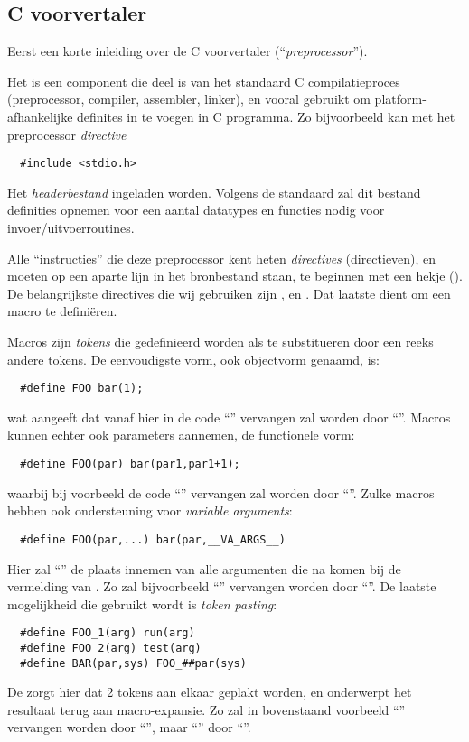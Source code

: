 \subsection{C voorvertaler} \label{sec:preproc}

Eerst een korte inleiding over de C voorvertaler (``{\em preprocessor}'').

Het is een component die deel is van het standaard C compilatieproces (preprocessor, compiler, assembler, linker), en vooral gebruikt om platform-afhankelijke definites in te voegen in C programma. Zo bijvoorbeeld kan met het preprocessor {\em directive} \begin{Verbatim}
  #include <stdio.h>
\end{Verbatim}
Het {\em headerbestand}  ingeladen worden. Volgens de standaard zal dit bestand definities opnemen voor een aantal datatypes en functies nodig voor invoer/uitvoerroutines. 

Alle ``instructies'' die deze preprocessor kent heten {\em directives} (directieven), en moeten op een aparte lijn in het bronbestand staan, te beginnen met een hekje (\code{\#}). De belangrijkste directives die wij gebruiken zijn , en . Dat laatste dient om een macro te defini\"eren.

Macros zijn {\em tokens} die gedefinieerd worden als te substitueren door een reeks andere tokens. De eenvoudigste vorm, ook objectvorm genaamd, is: \begin{Verbatim}
  #define FOO bar(1);
\end{Verbatim}
wat aangeeft dat vanaf hier in de code ``'' vervangen zal worden door ``''. Macros kunnen echter ook parameters aannemen, de functionele vorm: \begin{Verbatim}
  #define FOO(par) bar(par1,par1+1);
\end{Verbatim}
waarbij bij voorbeeld de code ``'' vervangen zal worden door ``''. Zulke macros hebben ook ondersteuning voor {\em variable arguments}: \begin{Verbatim}
  #define FOO(par,...) bar(par,__VA_ARGS__)
\end{Verbatim}
Hier zal ``'' de plaats innemen van alle argumenten die na  komen bij de vermelding van . Zo zal bijvoorbeeld ``'' vervangen worden door ``''. De laatste mogelijkheid die gebruikt wordt is {\em token pasting}: \begin{Verbatim}
  #define FOO_1(arg) run(arg)
  #define FOO_2(arg) test(arg)
  #define BAR(par,sys) FOO_##par(sys)
\end{Verbatim}
De \code{\#\#} zorgt hier dat 2 tokens aan elkaar geplakt worden, en onderwerpt het resultaat terug aan macro-expansie. Zo zal in bovenstaand voorbeeld ``'' vervangen worden door ``'', maar ``'' door ``''.

